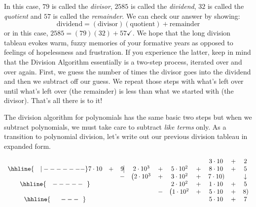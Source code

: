 \documentclass{ximera}
\begin{document}
In this case, $79$ is called the \emph{divisor}, $2585$ is called the \emph{dividend}, $32$ is called the \emph{quotient} and $57$ is called the \emph{remainder}.  We can check our answer by showing:  
\[ 
    \text{dividend} = (\text{divisor})( \text{quotient}) + \text{remainder}
\] 
or in this case, $2585 = (79)(32) + 57 \checkmark$.  We hope that the long division tableau evokes warm, fuzzy memories of your formative years as opposed to feelings of hopelessness and frustration.  If you experience the latter, keep in mind that the Division Algorithm essentially is a two-step process, iterated over and over again.  First, we guess the number of times the divisor goes into the dividend and  then we subtract off our guess.  We repeat those steps with what's left over until what's left over (the remainder) is less than what we started with (the divisor).  That's all there is to it!

The division algorithm for polynomials has the same basic two steps but when we subtract polynomials, we must take care to subtract \emph{like terms} only.  As a transition to polynomial division, let's write out our previous division tableau in expanded form.


\setlength\arraycolsep{0.1pt}
\setlength\extrarowheight{2pt}

\[ 
\begin{array}{cccccccccc}
            & &         &                           & &                           & & 3 \cdot 10                &+& 2 \\ \hhline{~~~|-------}
7 \cdot 10  &+& 9\vline & 2\cdot 10^3               &+& 5 \cdot 10^2              &+& 8 \cdot 10                &+& 5 \\
            & & -       & \left(2 \cdot 10^3 \right.&+&  3 \cdot 10^2             &+& \left. 7 \cdot 10 \right) & &  \downarrow \\ \hhline{~~~-----~~} 
            & &         &                           & & 2 \cdot 10^2              &+& 1 \cdot 10                &+& 5 \\ 
            & &         &                           &-& \left(1 \cdot 10^2 \right.&+&  5 \cdot 10               &+&\left.  8 \right) \\ \hhline{~~~~~---~~} 
            & &         &                           & &  & & 5 \cdot 10           &+& 7 \\
\end{array}
\]
\end{document}
